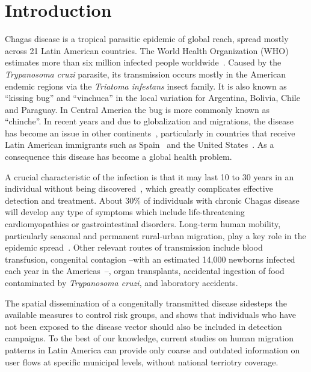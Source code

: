 
\chapter{Introduction}\label{ch:introduction}


Chagas disease is a tropical parasitic epidemic of global reach, spread mostly across 21 Latin American countries. The World Health Organization (WHO) estimates more than six million infected people worldwide~\citep{who2016}. Caused by the \textit{Trypanosoma cruzi} parasite, its transmission occurs mostly in the American endemic regions via the \textit{Triatoma infestans} insect family. It is also known as ``kissing bug'' and ``vinchuca'' in the local variation for Argentina, Bolivia, Chile and Paraguay. In Central America the bug is more commonly known as ``chinche''.
In recent years and due to globalization and migrations, the disease has become an %
issue in other continents~\citep{schmunis2010chagas},
particularly in countries that receive Latin American immigrants such as Spain~\citep{navarro2012chagas} and the United States~\citep{hotez2013unfolding}.
As a consequence this disease has become a global health problem.


A crucial characteristic of the infection is that it may last 10 to 30 years in an individual without being discovered~\citep{rassi2012american}, which greatly complicates effective detection and treatment.
About 30\% of individuals with chronic Chagas disease will develop any type of symptoms which include life-threatening cardiomyopathies or gastrointestinal disorders.
Long-term human mobility, particularly seasonal and permanent rural-urban migration, play a key role in the epidemic spread~\citep{briceno2009chagas}.
Other relevant routes of transmission include blood transfusion, congenital contagion --with an estimated 14,000 newborns infected each year in the Americas~\citep{OPS2006chagas}--, organ transplants, accidental ingestion of food contaminated by \textit{Trypanosoma cruzi}, and laboratory accidents.

The spatial dissemination of a congenitally transmitted disease sidesteps the available measures to control risk groups, and shows that individuals who have not been exposed to the disease vector should also be included in detection campaigns.
To the best of our knowledge, current studies on human migration patterns in Latin America can provide only coarse and outdated information on user flows at specific municipal levels, without national terriotry coverage.

